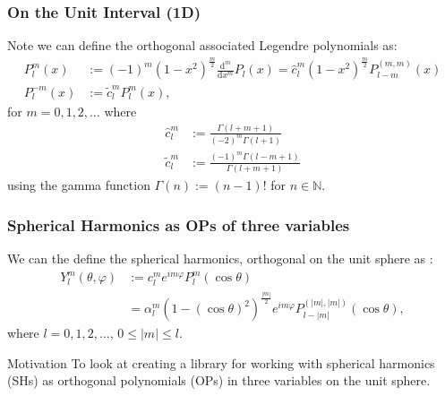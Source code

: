\documentclass[10pt]{beamer}
\newcommand{\N}{\mathbb{N}}
\newcommand{\Ylmfull}{Y^m_l(\theta,\varphi)}
\newcommand{\Plm}{P^m_l}
\newcommand{\costheta}{\cos\theta}
\newcommand{\eimphi}{e^{im\varphi}}
\newcommand{\alphalm}{\alpha^m_l}
\newcommand{\clm}{c^m_l}
\newcommand{\ctilde}{\tilde{c}^m_l}
\newcommand{\chat}{\hat{c}^m_l}
\newcommand{\dmdxm}{\frac{\mathrm{d}^m}{\mathrm{d}x^m}}
\begin{document}
\frame
{
  \frametitle{On the Unit Interval (1D)}

Note we can define the orthogonal associated Legendre polynomials as:
\begin{align}
\Plm(x) &:= (-1)^m (1-x^2)^\frac{m}{2} \dmdxm P_l(x) = \chat (1-x^2)^\frac{m}{2} P^{(m,m)}_{l-m}(x) \\
P^{-m}_l(x) &:= \ctilde \Plm(x),
\end{align}
for \(m = 0,1,2,\ldots\) where
\begin{align}
\chat &:= \frac{\Gamma(l+m+1)}{(-2)^m\Gamma(l+1)} \\
\ctilde &:= \frac{(-1)^m\Gamma(l-m+1)}{\Gamma(l+m+1)}
\end{align}
using the gamma function \(\Gamma(n) := (n-1)!\) for \(n \in \N\).

}

\frame
{
    \frametitle{Spherical Harmonics as OPs of three variables}
    
We can the define the spherical harmonics, orthogonal on the unit sphere as \cite{DLMFSphericalandSpheroidalHarmonics, DLMFFerrers, DLMFAssociatedLegendre}:
\begin{align}
\Ylmfull &:= \clm \eimphi \Plm (\costheta) \nonumber \\
&= \alphalm (1 - (\costheta)^2)^\frac{|m|}{2} \eimphi P^{(|m|,|m|)}_{l-|m|}(\costheta), 
\end{align}
where $l = 0, 1, 2, \dots$, $0 \le |m| \le l$.

\begin{block}{Motivation}
To look at creating a library for working with spherical harmonics (SHs) as orthogonal polynomials (OPs) in three variables on the unit sphere.
\end{block}

}
\end{document}

